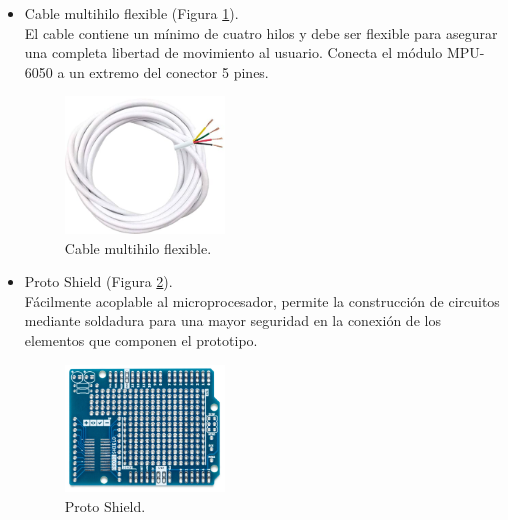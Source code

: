 \begin{itemize}
    \item Cable multihilo flexible (Figura \ref{fig:cableMultihilo}).\\
    El cable contiene un mínimo de cuatro hilos y debe ser flexible para asegurar una completa libertad de movimiento al usuario. Conecta el módulo MPU-6050 a un extremo del conector 5 pines.

    \begin{figure}[h]
        \centering
        \includegraphics[width=0.4\textwidth]{img/4.TecnicasHerramientas/CableMultihilo.png}
        \caption{Cable multihilo flexible. \cite{Cable41:online}}
        \label{fig:cableMultihilo}
    \end{figure}
    
    \item Proto Shield (Figura \ref{fig:shield}).\\
    Fácilmente acoplable al microprocesador, permite la construcción de circuitos mediante soldadura para una mayor seguridad en la conexión de los elementos que componen el prototipo.

    \begin{figure}[h]
        \centering
        \includegraphics[width=0.4\textwidth]{img/4.TecnicasHerramientas/Protoshield.png}
        \caption{Proto Shield. \cite{ProtoShi18:online}}
        \label{fig:shield}
    \end{figure}
    
    
\end{itemize}



